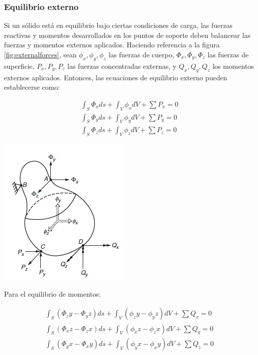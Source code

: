 \subsubsection{Equilibrio externo}

Si un sólido está en equilibrio bajo ciertas condiciones de carga, las fuerzas reactivas y momentos desarrollados en 
los puntos de soporte deben balancear las fuerzas y momentos externos aplicados. Haciendo referencia a la figura 
\ref{fig:externalforces}, sean $\phi_x, \phi_y, \phi_z$ las fuerzas de cuerpo, $\Phi_x, \Phi_y, \Phi_z$ las 
fuerzas de superficie, $P_x, P_y, P_z$ las fuerzas concentradas externas, y $Q_x, Q_y, Q_z$ los momentos externos 
aplicados. Entonces, las ecuaciones de equilibrio externo pueden establecerse como:

\begin{eqnarray}
\int_S \Phi_x ds + \int_V \phi_x dV + \sum P_x = 0 \nonumber \\
\int_S \Phi_y ds + \int_V \phi_y dV + \sum P_y = 0 \\
\int_S \Phi_z ds + \int_V \phi_z dV + \sum P_z = 0 \nonumber
\end{eqnarray}

\begin{center}
\includegraphics[scale]{src/ch2/equillibrium_force.png}
\label{fig:externalforces}
\end{center}

Para el equilibrio de momentos:

\begin{eqnarray}
\int_S (\Phi_zy - \Phi_{y}z) ds + \int_V (\phi_zy - \phi_{y}z) dV + \sum Q_x = 0 \nonumber \\
\int_S (\Phi_x z - \Phi_z x) ds + \int_V (\phi_x z - \phi_z x) dV + \sum Q_y = 0 \\
\int_S (\Phi_{y}x - \Phi_x y) ds + \int_V (\phi_{y}x - \phi_x y) dV + \sum Q_z = 0 \nonumber
\end{eqnarray}


